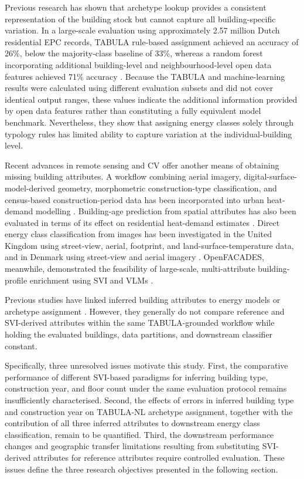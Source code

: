 Previous research has shown that archetype lookup provides a consistent representation of the building stock but cannot capture all building-specific variation.
In a large-scale evaluation using approximately 2.57 million Dutch residential EPC records, TABULA rule-based assignment achieved an accuracy of 26\%, below the majority-class baseline of 33\%, whereas a random forest incorporating additional building-level and neighbourhood-level open data features achieved 71\% accuracy \parencite{hettinga2023}.
Because the TABULA and machine-learning results were calculated using different evaluation subsets and did not cover identical output ranges, these values indicate the additional information provided by open data features rather than constituting a fully equivalent model benchmark.
Nevertheless, they show that assigning energy classes solely through typology rules has limited ability to capture variation at the individual-building level.

Recent advances in remote sensing and \acf{CV} offer another means of obtaining missing building attributes.
A workflow combining aerial imagery, digital-surface-model-derived geometry, morphometric construction-type classification, and census-based construction-period data has been incorporated into urban heat-demand modelling \parencite{wurm2021}.
Building-age prediction from spatial attributes has also been evaluated in terms of its effect on residential heat-demand estimates \parencite{garbasevschi2021}.
Direct energy class classification from images has been investigated in the United Kingdom using street-view, aerial, footprint, and land-surface-temperature data, and in Denmark using street-view and aerial imagery \parencite{mayer2023uk,mayer2023dk}.
OpenFACADES, meanwhile, demonstrated the feasibility of large-scale, multi-attribute building-profile enrichment using \acf{SVI} and \acfp{VLM} \parencite{liang2025}.

Previous studies have linked inferred building attributes to energy models or archetype assignment \parencite{garbasevschi2021,wurm2021,dabrock2025}. However, they generally do not compare reference and \ac{SVI}-derived attributes within the same TABULA-grounded workflow while holding the evaluated buildings, data partitions, and downstream classifier constant.

Specifically, three unresolved issues motivate this study. First, the comparative performance of different SVI-based paradigms for inferring building type, construction year, and floor count under the same evaluation protocol remains insufficiently characterised. Second, the effects of errors in inferred building type and construction year on TABULA-NL archetype assignment, together with the contribution of all three inferred attributes to downstream energy class classification, remain to be quantified. Third, the downstream performance changes and geographic transfer limitations resulting from substituting SVI-derived attributes for reference attributes require controlled evaluation. These issues define the three research objectives presented in the following section.

